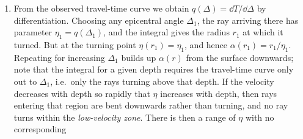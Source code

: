 \documentclass[a4paper,10pt]{paper}
\begin{document}
\begin{enumerate}
\begin{enumerate}
\begin{equation*}
    \int_{\eta_{1}}^{\eta_{b}}\frac{\Delta(q)}{\sqrt{q^{2}-\eta_{1}^{2}}}\dd q=2\int_{\eta_{1}}^{\eta_{b}}\dd q\int_{q}^{\eta_{b}}\dd\eta\,
    \frac{q}{\sqrt{(\eta^{2}-q^{2})(q^{2}-\eta_{1}^{2})}}\frac{\dd\ln r}{\dd\eta}.
\end{equation*}
The region of integration is $\eta_{1}\le q\le\eta\le\eta_{b}$, so exchanging the order gives
\begin{equation*}
    2\int_{\eta_{1}}^{\eta_{b}}\dd\eta\,\frac{\dd\ln r}{\dd\eta}\int_{\eta_{1}}^{\eta}\frac{q\,\dd q}{\sqrt{(\eta^{2}-q^{2})(q^{2}-\eta_{1}^{2})}}
    =2\cdot\frac{\pi}{2}\int_{\eta_{1}}^{\eta_{b}}\frac{\dd\ln r}{\dd\eta}\dd\eta=\pi\ln\frac{b}{r_{1}},
\end{equation*}
as required. To convert to an integral over the travel-time curve, note that the derivative of $\cosh^{-1}(q/\eta_{1})$ with respect to $q$ 
is $(q^{2}-\eta_{1}^{2})^{-1/2}$, so that integrating by parts
\begin{equation*}
    \int_{\eta_{1}}^{\eta_{b}}\frac{\Delta(q)}{\sqrt{q^{2}-\eta_{1}^{2}}}\dd q=\left[\Delta(q)\cosh^{-1}\frac{q}{\eta_{1}}\right]_{\eta_{1}}^{\eta_{b}}
    -\int_{\eta_{1}}^{\eta_{b}}\cosh^{-1}\!\left(\frac{q}{\eta_{1}}\right)\frac{\dd\Delta}{\dd q}\dd q.
\end{equation*}
The boundary term vanishes at both ends, since $\cosh^{-1}(1)=0$ and $\Delta(\eta_{b})=0$ (the ray of parameter $\eta_{b}$ grazes the surface). 
As $q$ increases from $\eta_{1}$ to $\eta_{b}$, $\Delta$ decreases from $\Delta_{1}$ to $0$, so reversing the direction of integration gives
\begin{equation*}
    \ln\frac{b}{r_{1}}=\frac{1}{\pi}\int_{0}^{\Delta_{1}}\cosh^{-1}\!\left[\frac{q(\Delta)}{\eta_{1}}\right]\dd\Delta.
\end{equation*}
\item From the observed travel-time curve we obtain $q(\Delta)=\dd T/\dd\Delta$ by differentiation. Choosing any epicentral angle $\Delta_{1}$, 
the ray arriving there has parameter $\eta_{1}=q(\Delta_{1})$, and the integral gives the radius $r_{1}$ at which it turned. But at the turning 
point $\eta(r_{1})=\eta_{1}$, and hence $\alpha(r_{1})=r_{1}/\eta_{1}$. Repeating for increasing $\Delta_{1}$ builds up $\alpha(r)$ from the surface 
downwards; note that the integral for a given depth requires the travel-time curve only out to $\Delta_{1}$, i.e.\ only the rays turning above 
that depth. If the velocity decreases with depth so rapidly that $\eta$ increases with depth, then rays entering that region are bent 
downwards rather than turning, and no ray turns within the \emph{low-velocity zone}. There is then a range of $\eta$ with no corresponding 

\end{enumerate}
\end{enumerate}
\end{document}
